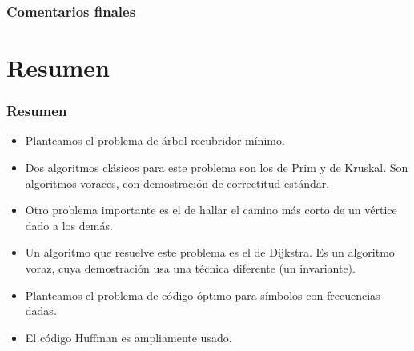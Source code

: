 \documentclass[english, spanish, fleqn,%
hyperref = {colorlinks, urlcolor = blue}%
]{beamer}
\begin{document}
\begin{frame}
  \setcounter{beamerpauses}{2}
  \frametitle{Comentarios finales}

\end{frame}

\section{Resumen}

\begin{frame}
  \setcounter{beamerpauses}{2}
  \frametitle{Resumen}

  \begin{itemize}
  \item
    Planteamos el problema de árbol recubridor mínimo.
  \item
    Dos algoritmos clásicos para este problema son los de Prim y de Kruskal.
    Son algoritmos voraces,
    con demostración de correctitud estándar.
  \item
    Otro problema importante es el de hallar el camino más corto
    de un vértice dado a los demás.
  \item
    Un algoritmo que resuelve este problema es el de Dijkstra.
    Es un algoritmo voraz,
    cuya demostración usa una técnica diferente
    (un invariante).
  \item
    Planteamos el problema de código óptimo
    para símbolos con frecuencias dadas.
  \item
    El código Huffman es ampliamente usado.
  \end{itemize}
\end{frame}
\end{document}
